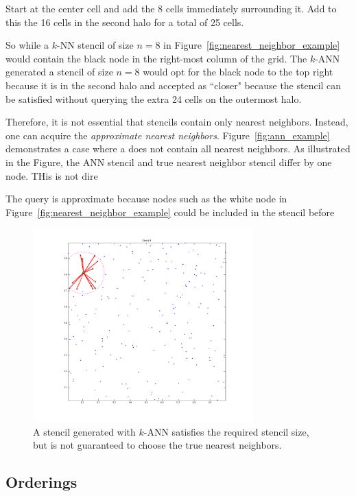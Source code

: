 \documentclass{report}
\begin{document}



Start at the center cell and add the 8 cells immediately surrounding it. Add to this the 16 cells in the second halo for a total of 25 cells. 

So while a $k$-NN stencil of size $n=8$ in Figure~\ref{fig:nearest_neighbor_example} would contain the black node in the right-most column of the grid. The $k$-ANN generated a stencil of size $n=8$ would opt for the black node to the top right because it is in the second halo and accepted as ``closer" because the stencil can be satisfied without querying the extra 24 cells on the outermost halo. 


Therefore, it is not essential that stencils contain only nearest neighbors. Instead, one can acquire the \emph{approximate nearest neighbors}. Figure~\ref{fig:ann_example} demonstrates a case where a does not contain all nearest neighbors. As illustrated in the Figure, the ANN stencil and true nearest neighbor stencil differ by one node. THis is not dire


The query is approximate because nodes such as the white node in Figure~\ref{fig:nearest_neighbor_example} could be included in the stencil before 

\begin{figure}
\centering
\includegraphics[width=8.5cm]{rbffd_methods_content/neighbors/neighbor_incorrect.png}
\caption{A stencil generated with $k$-ANN satisfies the required stencil size, but is not guaranteed to choose the true nearest neighbors.}
\label{fig:approximate_nearest_neighbors}
\end{figure}



\subsection{Orderings}
\end{document}
